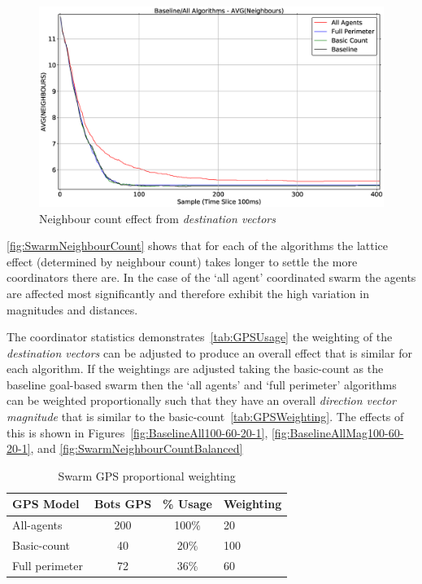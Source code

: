 \begin{figure}[H]
\begin{center}
\includegraphics[width=14cm]{CHAPTER-6/figures/SwarmNeighbourCount}
\end{center}
\caption{Neighbour count effect from \textit{destination vectors}\label{fig:SwarmNeighbourCount}}
\end{figure}

\autoref{fig:SwarmNeighbourCount} shows that for each of the algorithms the lattice effect (determined by neighbour count) takes longer to settle the more coordinators there are. In the case of the `all agent' coordinated swarm the agents are affected most significantly and therefore exhibit the high variation in magnitudes and distances.

The coordinator statistics demonstrates~\autoref{tab:GPSUsage} the weighting of the \textit{destination vectors} can be adjusted to produce an overall effect that is similar for each algorithm. If the weightings are adjusted taking the basic-count as the baseline goal-based swarm then the `all agents' and `full perimeter' algorithms can be weighted proportionally such that they have an overall \textit{direction vector magnitude} that is similar to the basic-count~\autoref{tab:GPSWeighting}. The effects of this is shown in Figures~\ref{fig:BaselineAll100-60-20-1}, \ref{fig:BaselineAllMag100-60-20-1}, and \ref{fig:SwarmNeighbourCountBalanced}

\begin{table}[H]
\begin{center}
\begin{tabular}{| l | c | c | l |}
\hline
GPS Model & Bots GPS & \% Usage & Weighting \\ \hline
All-agents & 200 & 100\% & 20 \\ \hline
Basic-count & 40 & 20\% & 100 \\ \hline
Full perimeter & 72 & 36\% & 60 \\  \hline
\end{tabular}\caption{Swarm GPS proportional weighting}\label{tab:GPSWeighting}
\end{center}
\end{table}

